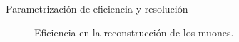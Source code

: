 \begin{frame}{Parametrizaci\'on de eficiencia y resoluci\'on}
\begin{figure}[ht]
\begin{minipage}[b]{0.45\linewidth}
\caption{Eficiencia en la reconstrucci\'on de los muones.}
\end{minipage}
\end{figure}
    
\end{frame}